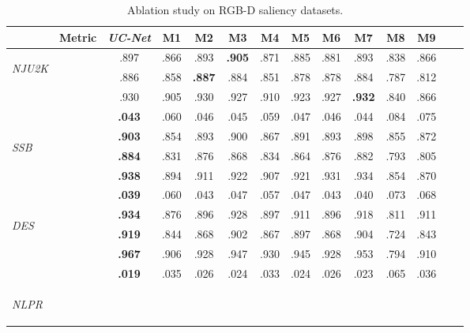 \documentclass[10pt,twocolumn,letterpaper]{article}
\def\ourmodel{\textit{UC-Net}}
\begin{document}
\begin{table}[t!]
  \centering
  \scriptsize
  \renewcommand{\arraystretch}{1.1}
  \renewcommand{\tabcolsep}{1.1mm}
  \caption{Ablation study on RGB-D saliency datasets. 
  \vspace{2mm}
}\label{tab:ablation_study}
  \begin{tabular}{lr|cccccccccccc}
  \hline
& Metric & \ourmodel &M1  & M2 & M3  & M4     & M5 & M6 & M7& M8& M9 \\
  \hline
  \multirow{4}{*}{\begin{sideways}\textit{NJU2K} \cite{NJU2000}\end{sideways}}
    &     & .897 & .866 & .893 & \textbf{.905} & .871  & .885 & .881& .893& .838& .866  \\
    &      & .886  & .858 & \textbf{.887} & .884 & .851  & .878& .878 & .884& .787& .812    \\
    &        & .930  & .905 & .930 & .927 & .910  & .923& .927 & \textbf{.932}& .840& .866   \\
    &  & \textbf{.043}  & .060 & .046 & .045 & .059  & .047 & .046 & .044& .084& .075 \\ \hline
\multirow{4}{*}{\begin{sideways}\textit{SSB} \cite{niu2012leveraging}\end{sideways}}
    &    & \textbf{.903} & .854 & .893 & .900 & .867  & .891 & .893& .898& .855& .872  \\
    &     & \textbf{.884}   & .831 & .876 & .868 & .834  & .864 & .876 & .882& .793& .805    \\
    &       & \textbf{.938}   & .894 & .911 & .922 & .907  & .921& .931 & .934& .854& .870   \\
    &  & \textbf{.039}  & .060 & .043 & .047 & .057 & .047 & .043 & .040& .073& .068  \\ \hline
\multirow{4}{*}{\begin{sideways}\textit{DES} \cite{cheng2014depth}\end{sideways}}
    &  & \textbf{.934}   & .876 & .896 & .928 & .897  & .911 & .896& .918& .811& .911  \\
    &    & \textbf{.919}    & .844 & .868 & .902 & .867  & .897& .868 & .904& .724& .843    \\
    &     & \textbf{.967}     & .906 & .928 & .947 & .930  & .945& .928 & .953& .794& .910   \\
    &  & \textbf{.019}  & .035 & .026 & .024 & .033  & .024& .026 & .023& .065& .036  \\ \hline
\multirow{4}{*}{\begin{sideways}\textit{NLPR} \cite{peng2014rgbd}\end{sideways}}

\end{tabular}
\end{table}
\end{document}
